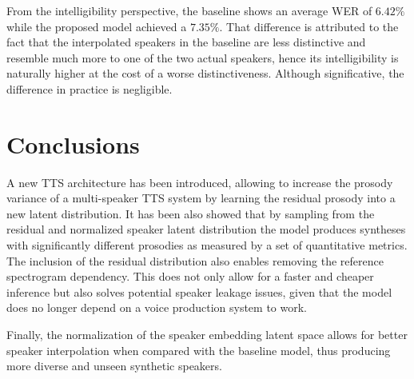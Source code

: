 From the intelligibility perspective, the baseline shows an average WER of $6.42\%$ while the proposed model achieved a $7.35\%$. That difference is attributed to the fact that the interpolated speakers in the baseline are less distinctive and resemble much more to one of the two actual speakers, hence its intelligibility is naturally higher at the cost of a worse distinctiveness. Although significative, the difference in practice is negligible.


\section{Conclusions}


A new TTS architecture has been introduced, allowing to increase the prosody variance of a multi-speaker TTS system by learning the residual prosody into a new latent distribution. It has been also showed that by sampling from the residual and normalized speaker latent distribution the model produces syntheses with significantly different prosodies as measured by a set of quantitative metrics. The inclusion of the residual distribution also enables removing the reference spectrogram dependency. This does not only     allow for a faster and  cheaper inference but also         solves potential speaker leakage issues, given that the model does no longer depend on a voice production system to work.


Finally, the normalization of the speaker embedding latent space allows for better speaker interpolation when compared with the baseline model, thus producing more diverse and unseen synthetic speakers.


